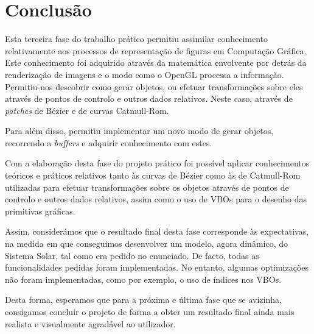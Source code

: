 \documentclass[a4paper, 11pt]{article}
\begin{document}
\pagebreak

\section{Conclusão}

Esta terceira fase do trabalho prático permitiu assimilar conhecimento relativamente aos processos 
de representação de figuras em Computação Gráfica. Este conhecimento foi adquirido através da 
matemática envolvente por detrás da renderização de imagens e o modo como o OpenGL processa a 
informação. Permitiu-nos descobrir como gerar objetos, ou efetuar transformações sobre eles 
através de pontos de controlo e outros dados relativos. Neste caso, através de \textit{patches} 
de Bézier e de curvas Catmull-Rom.

Para além disso, permitiu implementar um novo modo de gerar objetos, recorrendo a \textit{buffers} 
e adquirir conhecimento com estes.

Com a elaboração desta fase do projeto prático foi possível aplicar conhecimentos teóricos e 
práticos relativos tanto às curvas de Bézier como às de Catmull-Rom utilizadas para efetuar 
transformações sobre os objetos através de pontos de controlo e outros dados relativos, assim 
como o uso de VBOs para o desenho das primitivas gráficas.

Assim, considerámos que o resultado final desta fase corresponde às expectativas, na medida em 
que conseguimos desenvolver um modelo, agora dinâmico, do Sistema
Solar, tal como era pedido no enunciado. De facto, todas as funcionalidades pedidas foram 
implementadas. No entanto, algumas optimizações não foram implementadas, como por exemplo, o uso 
de índices nos VBOs. 

Desta forma, esperamos que para a próxima e última fase que se avizinha, consigamos concluir o 
projeto de forma a obter um resultado final ainda mais realista e visualmente agradável ao 
utilizador.

\pagebreak



\end{document}
